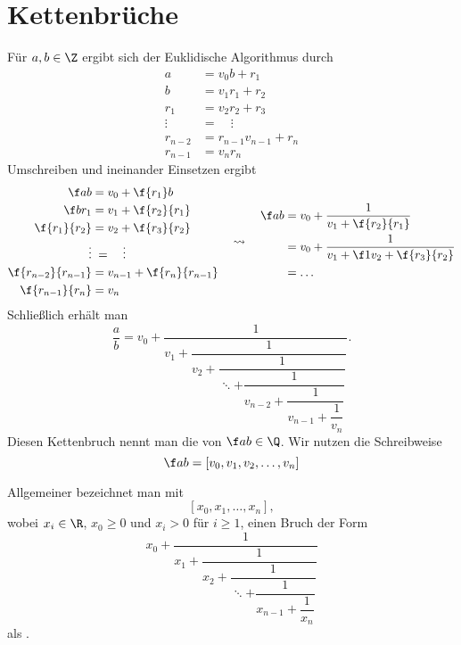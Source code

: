 \chapter{Kettenbrüche}
\label{chap:6}


\begin{ex}
	Für $a, b \in \Z$ ergibt sich der Euklidische Algorithmus durch
	\begin{align*}
		a &= v_0 b + r_1 \\
		b &= v_1 r_1 + r_2 \\
		r_1 &= v_2 r_2 + r_3 \\
		\vdots \; &= \quad \vdots \\
		r_{n-2} &= r_{n-1} v_{n-1} + r_n \\
		r_{n-1} &= v_n r_n
	\end{align*}
	Umschreiben und ineinander Einsetzen ergibt
	\begin{align*}
		\begin{aligned}
			\f ab &= v_0 + \f {r_1}b \\
			\f b{r_1} &= v_1 + \f {r_2}{r_1} \\
			\f {r_1}{r_2} &= v_2 + \f{r_3}{r_2} \\
			\vdots &\;= \quad \vdots \\
			\f {r_{n-2}}{r_{n-1}} &= v_{n-1} + \f{r_n}{r_{n-1}} \\
			\f {r_{n-1}}{r_n} &= v_n
		\end{aligned}
		\quad\leadsto\quad
		\begin{aligned}
			\f ab
			&= v_0 + \dfrac 1{v_1 + \f{r_2}{r_1}} \\
			&= v_0 + \dfrac 1{v_1 + \f 1{v_2 + \f {r_3}{r_2}}} \\
			&= \dotso
		\end{aligned}
	\end{align*}
	Schließlich erhält man
	\[
		\dfrac ab
		= v_0 + \dfrac 1{v_1 + \dfrac 1{v_2 + \dfrac 1{\ddots + \dfrac 1{v_{n-2} + \dfrac 1{v_{n-1} + \dfrac 1{v_n}}}}} }.
	\]
	Diesen Kettenbruch nennt man die  von $\f ab \in \Q$.
	Wir nutzen die Schreibweise
	\[
		\f ab = [v_0, v_1, v_2, \dotsc, v_n]
	\]

	Allgemeiner bezeichnet man mit
	\[
		[x_0, x_1, \dotsc, x_n],
	\]
	wobei $x_i \in \R$, $x_0 \ge 0$ und $x_i > 0$ für $i \ge 1$, einen Bruch der Form
	\[
		x_0 + \dfrac 1{x_1 + \dfrac 1{x_2 + \dfrac 1{\ddots + \dfrac 1{x_{n-1} + \dfrac 1{x_n}}}}}
	\]
	als .
\end{ex}

